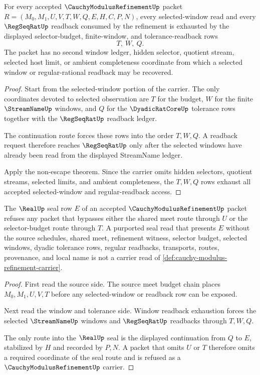 \begin{theorem}
\label{thm:cauchy-modulus-refinement-window-readback-exhaustion}
For every accepted $\CauchyModulusRefinementUp$ packet $R=(M_0,M_1,U,V,T,W,Q,E,H,C,P,N)$, every selected-window read and every $\RegSeqRatUp$ readback consumed by the refinement is exhausted by the displayed selector-budget, finite-window, and tolerance-readback rows
$$
T,\ W,\ Q.
$$
The packet has no second window ledger, hidden selector, quotient stream, selected host limit, or ambient completeness coordinate from which a selected window or regular-rational readback may be recovered.
\end{theorem}
\begin{proof}
Start from the selected-window portion of the carrier. The only coordinates devoted to selected observation are $T$ for the budget, $W$ for the finite $\StreamNameUp$ windows, and $Q$ for the $\DyadicRatCoreUp$ tolerance rows together with the $\RegSeqRatUp$ readback ledger.

The continuation route forces these rows into the order $T,W,Q$. A readback request therefore reaches $\RegSeqRatUp$ only after the selected windows have already been read from the displayed StreamName ledger.

Apply the non-escape theorem. Since the carrier omits hidden selectors, quotient streams, selected limits, and ambient completeness, the $T,W,Q$ rows exhaust all accepted selected-window and regular-readback access.
\end{proof}

\begin{theorem}
\label{thm:cauchy-modulus-refinement-real-seal-refusal}
The $\RealUp$ seal row $E$ of an accepted $\CauchyModulusRefinementUp$ packet refuses any packet that bypasses either the shared meet route through $U$ or the selector-budget route through $T$. A purported seal read that presents $E$ without the source schedules, shared meet, refinement witness, selector budget, selected windows, dyadic tolerance rows, regular readbacks, transports, routes, provenance, and local name is not a carrier read of \autoref{def:cauchy-modulus-refinement-carrier}.
\end{theorem}
\begin{proof}
First read the source side. The source meet budget chain places $M_0,M_1,U,V,T$ before any selected-window or readback row can be exposed.

Next read the window and tolerance side. Window readback exhaustion forces the selected $\StreamNameUp$ windows and $\RegSeqRatUp$ readbacks through $T,W,Q$.

The only route into the $\RealUp$ seal is the displayed continuation from $Q$ to $E$, stabilized by $H$ and recorded by $P,N$. A packet that omits $U$ or $T$ therefore omits a required coordinate of the seal route and is refused as a $\CauchyModulusRefinementUp$ carrier.
\end{proof}

